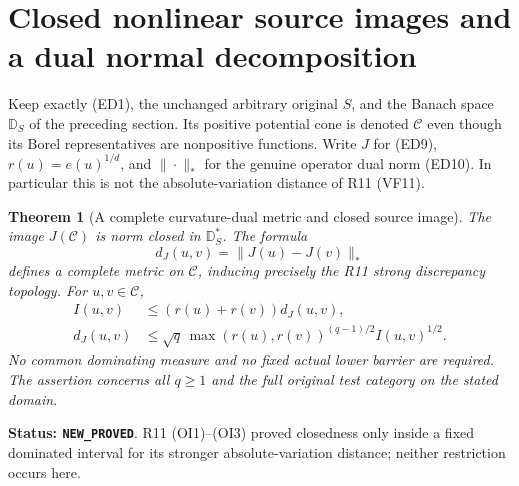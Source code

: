 \documentclass[11pt,a4paper]{article}
\numberwithin{equation}{section}
\newtheorem{theorem}{Theorem}[section]
\theoremstyle{definition}
\theoremstyle{remark}
\begin{document}
\section{Closed nonlinear source images and a dual normal decomposition}
\label{sec:r12-nonlinear-dual-source}

Keep exactly (ED1), the unchanged arbitrary original $S$, and the
Banach space $\mathbb D_S$ of the preceding section. Its positive
potential cone is denoted $\mathscr C$ even though its Borel
representatives are nonpositive functions. Write $J$ for (ED9),
$r(u)=e(u)^{1/d}$, and $\|\cdot\|_*$ for the genuine operator
dual norm (ED10). In particular this is not the absolute-variation
distance of R11 (VF11).

\begin{theorem}[A complete curvature-dual metric and closed source image]
\label{thm:r12-closed-full-source-image}
The image $J(\mathscr C)$ is norm closed in $\mathbb D_S^*$.
The formula
\[
                 d_J(u,v)=\|J(u)-J(v)\|_*
 \tag{NI1}
\]
defines a complete metric on $\mathscr C$, inducing precisely the
R11 strong discrepancy topology. For $u,v\in\mathscr C$,
\[
 \begin{split}
 I(u,v)&\leq(r(u)+r(v))d_J(u,v),\\
 d_J(u,v)&\leq\sqrt q\,
     \max(r(u),r(v))^{(q-1)/2}I(u,v)^{1/2}.
 \end{split}
 \tag{NI2}
\]
No common dominating measure and no fixed actual lower barrier
are required. The assertion concerns all $q\geq1$ and the full
original test category on the stated domain.
\end{theorem}

\noindent\textbf{Status: \texttt{NEW\_PROVED}}. R11 (OI1)--(OI3)
proved closedness only inside a fixed dominated interval for its
stronger absolute-variation distance; neither restriction occurs here.
\end{document}
